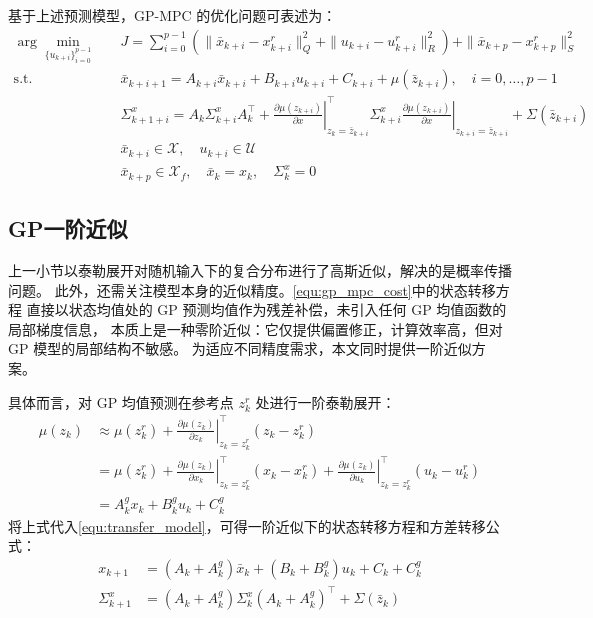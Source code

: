 基于上述预测模型，GP-MPC 的优化问题可表述为：
\begin{equation}
\label{equ:gp_mpc_cost}
\begin{aligned}
    \arg\min_{\{u_{k+i}\}_{i=0}^{p-1}} \quad 
    & J = \sum_{i=0}^{p-1} \left(
        \|\bar{x}_{k+i} - x^{r}_{k+i}\|_Q^2
        + \|u_{k+i} - u^{r}_{k+i}\|_R^2 \right)
    + \|\bar{x}_{k+p} - x^{r}_{k+p}\|_S^2 \\
    \mathrm{s.t.} \quad
    & \bar{x}_{k+i+1} = A_{k+i} \bar{x}_{k+i} + B_{k+i} u_{k+i} + C_{k+i} 
      + \mu(\bar{z}_{k+i}), \quad i = 0, \ldots, p-1 \\
    & \Sigma_{k+1+i}^x = A_k \Sigma_{k+i}^x A_k^\top + \left.\frac{\partial \mu(z_{k+i})}{\partial x}\right|_{z_k = \bar{z}_{k+i}}^\top
         \Sigma_{k+i}^x \left.\frac{\partial \mu(z_{k+i})}{\partial x}\right|_{z_{k+i} = \bar{z}_{k+i}} + \Sigma(\bar{z}_{k+i}) \\
    & \bar{x}_{k+i} \in \mathcal{X},\quad u_{k+i} \in \mathcal{U} \\
    & \bar{x}_{k+p} \in \mathcal{X}_f,\quad \bar{x}_k = x_k,\quad \Sigma_k^x = 0
\end{aligned}
\end{equation}

\subsection{GP一阶近似}

上一小节以泰勒展开对随机输入下的复合分布进行了高斯近似，解决的是概率传播问题。
此外，还需关注模型本身的近似精度。\autoref{equ:gp_mpc_cost}中的状态转移方程
直接以状态均值处的 GP 预测均值作为残差补偿，未引入任何 GP 均值函数的局部梯度信息，
本质上是一种零阶近似：它仅提供偏置修正，计算效率高，但对 GP 模型的局部结构不敏感。
为适应不同精度需求，本文同时提供一阶近似方案。

具体而言，对 GP 均值预测在参考点 $z_k^r$ 处进行一阶泰勒展开：
\begin{equation}
    \begin{aligned}
        \mu(z_k) & \approx \mu(z_k^r) 
        + \left.\frac{\partial\mu(z_k)}{\partial z_k}\right|_{z_k=z_k^r}^{\!\top}(z_k - z_k^r) \\
        &= \mu(z_k^r) 
        + \left.\frac{\partial\mu(z_k)}{\partial x_k}\right|_{z_k=z_k^r}^{\!\top}(x_k - x_k^r) 
        + \left.\frac{\partial\mu(z_k)}{\partial u_k}\right|_{z_k=z_k^r}^{\!\top}(u_k - u_k^r) \\
        &= A_k^g x_k + B_k^g u_k + C_k^g
    \end{aligned}
\end{equation}
将上式代入\autoref{equ:transfer_model}，可得一阶近似下的状态转移方程和方差转移公式：
\begin{equation} \label{equ:first_order_gp}
    \begin{aligned}
        x_{k+1} &= (A_k + A_k^g)\bar{x}_k + (B_k + B_k^g) u_k + C_k + C_k^g \\
        \Sigma_{k+1}^x &= (A_k + A_k^g) \Sigma_{k}^x (A_k + A_k^g)^\top + \Sigma(\bar{z}_k)
    \end{aligned}
\end{equation}

